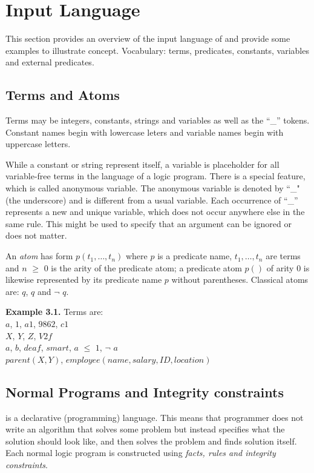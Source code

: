 \documentclass[14pt,a4paper, titlepage]{article}
\begin{document}
\section{Input Language}%
This section provides an overview of the input language of \dlvhex{} and provide some examples to illustrate concept. Vocabulary: terms, predicates, constants, variables and external predicates.   

\subsection{Terms and Atoms}
Terms may be integers, constants, strings and variables as well as the \enquote{\_} tokens. Constant names begin with lowercase leters and variable names begin with uppercase letters.

While a constant or string represent itself, a variable is placeholder for all variable-free terms in the language of a logic program. There is a special feature, which is called anonymous variable. The anonymous variable is denoted by ``\_" (the underscore) and is different from a usual variable. Each occurrence of \enquote{\_} represents a new and unique variable, which does not occur anywhere else in the same rule. This might be used to specify that an argument can be ignored or does not matter.

An \emph{atom} has form $\mathit{p(t_1,\dots,t_n)}$ where $p$ is a predicate name, $t_1,\dots,t_n$ are terms and $n$ $\geq$ $0$ is the arity of the predicate atom; a predicate atom $p()$ of arity 0 is likewise represented by its predicate name $p$ without parentheses. Classical atoms are: $q$, $q$ and $\neg$ $q$.

\textbf{Example 3.1.} 
Terms are:
\\  $a$, $1$, $\mathit{a1}$, $\mathit{9862}$, $\mathit{c1}$
\\  $X$, $Y$, $Z$, $\mathit{V2f}$
\\  $a$, $b$, $\mathit{deaf}$, $\mathit{smart}$, $a$ $\leq$ $1$, $\neg$ $a$
\\  $\mathit{parent}(X,Y)$, $\mathit{employee}(name, salary, ID, location)$
       
\subsection{Normal Programs and Integrity constraints}
\dlvhex{} is a declarative (programming) language. This means that programmer does not write an algorithm that solves some problem but instead specifies what the solution should look like, and then solves the problem and finds solution itself. Each normal logic program is constructed using \emph{facts, rules and integrity constraints}. 
\end{document}
